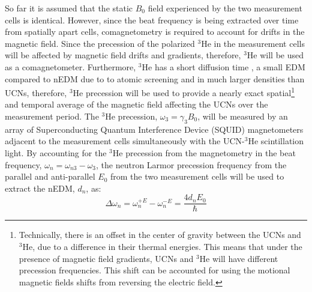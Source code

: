 So far it is assumed that the static $B_0$ field experienced by the two measurement cells is identical. However, since the beat frequency is being extracted over time from spatially apart cells, comagnetometry is required to account for drifts in the magnetic field. Since the precession of the polarized $^3$He in the measurement cells will be affected by magnetic field drifts and gradients, therefore, $^3$He will be used as a comagnetometer. Furthermore, $^3$He has a short diffusion time \cite{Lamoreaux2002}, a small EDM compared to nEDM due to to atomic screening \cite{Dzuba2007, Flambaum2012} and in much larger densities than UCNs, therefore, $^3$He precession will be used to provide a nearly exact spatial\footnote{Technically, there is an offset in the center of gravity between the UCNs and $^3$He, due to a difference in their thermal energies. This means that under the presence of magnetic field gradients, UCNs and $^3$He will have different precession frequencies. This shift can be accounted for using the motional magnetic fields shifts from  reversing the electric field.} and temporal average of the magnetic field affecting the UCNs over the measurement period. The $^3$He precession, $\omega_{3} = \gamma_3 B_0$, will be measured by an array of Superconducting Quantum Interference Device (SQUID) magnetometers adjacent to the measurement cells \cite{Kim2015} simultaneously with the UCN-$^3$He scintillation light. By accounting for the $^3$He precession from the magnetometry in the beat frequency, $ \omega_{n} = \omega_{n3} - \omega_{3} $, the neutron Larmor precession frequency from the parallel and anti-parallel $E_0$ from the two measurement cells will be used to extract the nEDM, $d_n$, as:
\begin{equation}
 \Delta \omega_{n} = \omega_{n}^{+E} - \omega_{n}^{-E} = \frac{4d_nE_0}{\hbar}
\end{equation}




